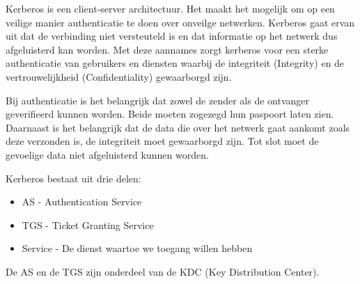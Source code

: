 Kerberos is een client-server architectuur. Het maakt het mogelijk om op een veilige manier authenticatie te doen over onveilge netwerken. Kerberos gaat ervan uit dat de verbinding niet versteuteld is en dat informatie op het netwerk dus afgeluisterd kan worden. Met deze aannames zorgt kerberos voor een sterke authenticatie van gebruikers en diensten waarbij de integriteit (Integrity) en de vertrouwelijkheid (Confidentiality) gewaarborgd zijn.

Bij authenticatie is het belangrijk dat zowel de zender als de ontvanger geverifieerd kunnen worden. Beide moeten zogezegd hun paspoort laten zien. Daarnaast is het belangrijk dat de data die over het netwerk gaat aankomt zoals deze verzonden is, de integriteit moet gewaarborgd zijn. Tot slot moet de gevoelige data niet afgeluisterd kunnen worden.

Kerberos bestaat uit drie delen:
\begin{itemize}
	\item AS - Authentication Service
	\item TGS - Ticket Granting Service
	\item Service - De dienst waartoe we toegang willen hebben
\end{itemize}
De AS en de TGS zijn onderdeel van de KDC (Key Distribution Center).

